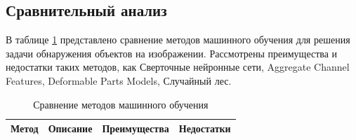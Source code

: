 \subsection{Сравнительный анализ}
В таблице \ref{tab:ml-compare} представлено сравнение методов машинного обучения для решения задачи обнаружения объектов на изображении. Рассмотрены преимущества и недостатки таких методов, как Сверточные нейронные сети, Aggregate Channel Features, Deformable Parts Models, Случайный лес.
\begin{longtable}{|l|l|l|l|}
\caption{Сравнение методов машинного обучения}
\label{tab:ml-compare}\\
\hline
\multicolumn{1}{|c|}{Метод}                                                                                                    & \multicolumn{1}{c|}{Описание}                                                                                                                                                                                                         & \multicolumn{1}{c|}{Преимущества}                                                                                                                                                                                                                                              & \multicolumn{1}{c|}{Недостатки}                                                                                                                                                                               \\ \hline
\endhead
%

\end{longtable}
